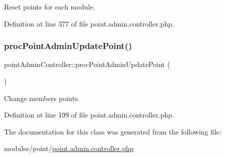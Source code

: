 Reset points for each module. 



Definition at line 377 of file point.\+admin.\+controller.\+php.

\mbox{\label{classpointAdminController_a2d90c166719dee56dbee47b7aa5eb30d}} 
\subsubsection{\texorpdfstring{proc\+Point\+Admin\+Update\+Point()}{procPointAdminUpdatePoint()}}
{\footnotesize\ttfamily point\+Admin\+Controller\+::proc\+Point\+Admin\+Update\+Point (\begin{DoxyParamCaption}{ }\end{DoxyParamCaption})}



Change members points. 



Definition at line 199 of file point.\+admin.\+controller.\+php.



The documentation for this class was generated from the following file\+:\begin{DoxyCompactItemize}
\item 
modules/point/\hyperlink{point_8admin_8controller_8php}{point.\+admin.\+controller.\+php}\end{DoxyCompactItemize}
